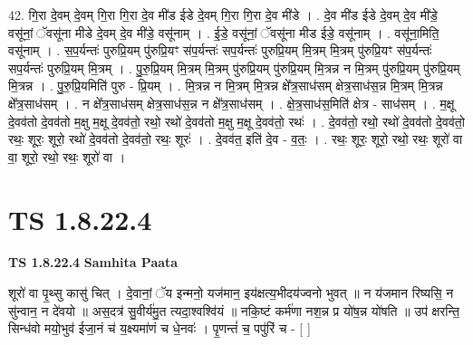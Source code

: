 \documentclass[17pt]{extarticle}
\begin{document}
42. गि॒रा दे॒वम् दे॒वम् गि॒रा गि॒रा दे॒व मी॑ड ईडे दे॒वम् गि॒रा गि॒रा दे॒व मी॑डे । . दे॒व मी॑ड ईडे दे॒वम् दे॒व मी॑डे॒ वसू॑नां॒ ॅवसू॑ना मीडे दे॒वम् दे॒व मी॑डे॒ वसू॑नाम् । . ई॒डे॒ वसू॑नां॒ ॅवसू॑ना मीड ईडे॒ वसू॑नाम् । . वसू॑ना॒मिति॒ वसू॑नाम् । . स॒प॒र्यन्तः॑ पुरुप्रि॒यम् पु॑रुप्रि॒यꣳ स॑प॒र्यन्तः॑ सप॒र्यन्तः॑ पुरुप्रि॒यम् मि॒त्रम् मि॒त्रम् पु॑रुप्रि॒यꣳ स॑प॒र्यन्तः॑ सप॒र्यन्तः॑ पुरुप्रि॒यम् मि॒त्रम् । . पु॒रु॒प्रि॒यम् मि॒त्रम् मि॒त्रम् पु॑रुप्रि॒यम् पु॑रुप्रि॒यम् मि॒त्रन्न न मि॒त्रम् पु॑रुप्रि॒यम् पु॑रुप्रि॒यम् मि॒त्रन्न । . पु॒रु॒प्रि॒यमिति॑ पुरु - प्रि॒यम् । . मि॒त्रन्न न मि॒त्रम् मि॒त्रन्न क्षे᳚त्र॒साध॑सम् क्षेत्र॒साध॑स॒न्न मि॒त्रम् मि॒त्रन्न क्षे᳚त्र॒साध॑सम् । . न क्षे᳚त्र॒साध॑सम् क्षेत्र॒साध॑स॒न्न न क्षे᳚त्र॒साध॑सम् । . क्षे॒त्र॒साध॑स॒मिति॑ क्षेत्र - साध॑सम् । . म॒क्षू दे॒वव॑तो दे॒वव॑तो म॒क्षु म॒क्षू दे॒वव॑तो॒ रथो॒ रथो॑ दे॒वव॑तो म॒क्षु म॒क्षू दे॒वव॑तो॒ रथः॑ । . दे॒वव॑तो॒ रथो॒ रथो॑ दे॒वव॑तो दे॒वव॑तो॒ रथः॒ शूरः॒ शूरो॒ रथो॑ दे॒वव॑तो दे॒वव॑तो॒ रथः॒ शूरः॑ । . दे॒वव॑त॒ इति॑ दे॒व - व॒तः॒ । . रथः॒ शूरः॒ शूरो॒ रथो॒ रथः॒ शूरो॑ वा वा॒ शूरो॒ रथो॒ रथः॒ शूरो॑ वा । \newline
\pagebreak
{}

\section{ TS 1.8.22.4 }

\textbf{TS 1.8.22.4 } \newline
\textbf{Samhita Paata} \newline

शूरो॑ वा पृ॒थ्सु कासु॑ चित् । दे॒वानां॒ ॅय इन्मनो॒ यज॑मान॒ इय॑क्षत्य॒भीदय॑ज्वनो भुवत् ॥ न य॑जमान रिष्यसि॒ न सु॑न्वान॒ न दे॑वयो ॥ अस॒दत्र॑ सु॒वीर्य॑मु॒त त्यदा॒श्वश्वि॑यं ॥ नकि॒ष्टं कर्म॑णा नश॒न्न प्र यो॑ष॒न्न यो॑षति ॥ उप॑ क्षरन्ति॒ सिन्ध॑वो मयो॒भुव॑ ईजा॒नं च॑ य॒क्ष्यमा॑णं च धे॒नवः॑ । पृ॒णन्तं॑ च॒ पपु॑रिं च - [ ] \newline
\end{document}
